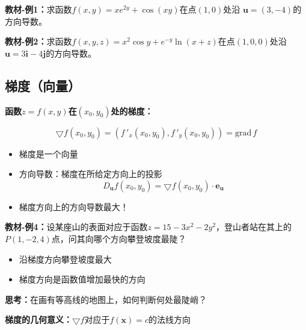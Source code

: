 {\bf 教材-例1：}求函数$f(x,y)=xe^{2y}+\cos(xy)$在点$(1,0)$处沿
$\bm{u}=(3,-4)$的方向导数。

{\bf 教材-例2：}求函数$f(x,y,z)=x^2\cos y+e^{-y}\ln(x+z)$在点$(1,0,0)$处沿
$\bm{u}=3\bm{i}-4\bm{j}$的方向导数。

\subsection{梯度（向量）}

{\bf 函数$z=f(x,y)$在$(x_0,y_0)$处的梯度：}

$$\bigtriangledown
f(x_0,y_0)=(f\,'_x(x_0,y_0),f\,'_y(x_0,y_0))=\bm{\mathrm{grad}}\,f$$

\begin{itemize}
  \item 梯度是一个向量
  \item 方向导数：梯度在所给定方向上的投影
  $${D_{\bm{u}}f(x_0,y_0)=\bigtriangledown f(x_0,y_0)\cdot\bm{e_u}}$$
  \item 梯度方向上的方向导数最大！
\end{itemize}

{\bf 教材-例4：}设某座山的表面对应于函数$z=15-3x^2-2y^2$，登山者站在其上的
$P(1,-2,4)$点，问其向哪个方向攀登坡度最陡？

\begin{itemize}
  \item 沿梯度方向攀登坡度最大 
  \item 梯度方向是函数值增加最快的方向 
\end{itemize}

{\bf 思考：}在画有等高线的地图上，如何判断何处最陡峭？

{\bf 梯度的几何意义：}$\bigtriangledown f$对应于$f(\bm{x})=c$的法线方向

